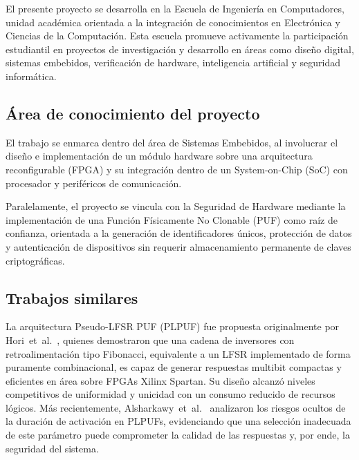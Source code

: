 El presente proyecto se desarrolla en la Escuela de Ingeniería en Computadores, unidad
académica orientada a la integración de conocimientos en Electrónica y Ciencias de la
Computación. Esta escuela promueve activamente la participación estudiantil en proyectos
de investigación y desarrollo en áreas como diseño digital, sistemas embebidos,
verificación de hardware, inteligencia artificial y seguridad informática.

\subsection{Área de conocimiento del proyecto}

El trabajo se enmarca dentro del área de Sistemas Embebidos, al involucrar el diseño e
implementación de un módulo hardware sobre una arquitectura reconfigurable (FPGA) y su
integración dentro de un System-on-Chip (SoC) con procesador y periféricos de
comunicación.

Paralelamente, el proyecto se vincula con la Seguridad de Hardware mediante la
implementación de una Función Físicamente No Clonable (PUF) como raíz de confianza,
orientada a la generación de identificadores únicos, protección de datos y autenticación
de dispositivos sin requerir almacenamiento permanente de claves criptográficas.

\subsection{Trabajos similares}

La arquitectura Pseudo-LFSR PUF (PLPUF) fue propuesta originalmente por
Hori~et~al.~\cite{hori_2011_pseudolfsr}, quienes demostraron que una cadena
de inversores con retroalimentación tipo Fibonacci, equivalente a un LFSR
implementado de forma puramente combinacional, es capaz de generar respuestas
multibit compactas y eficientes en área sobre FPGAs Xilinx Spartan. Su
diseño alcanzó niveles competitivos de uniformidad y unicidad con un consumo
reducido de recursos lógicos. Más recientemente,
Alsharkawy~et~al.~\cite{alsharkawy_2024_plpufs} analizaron los riesgos
ocultos de la duración de activación en PLPUFs, evidenciando que una
selección inadecuada de este parámetro puede comprometer la calidad de las
respuestas y, por ende, la seguridad del sistema.

